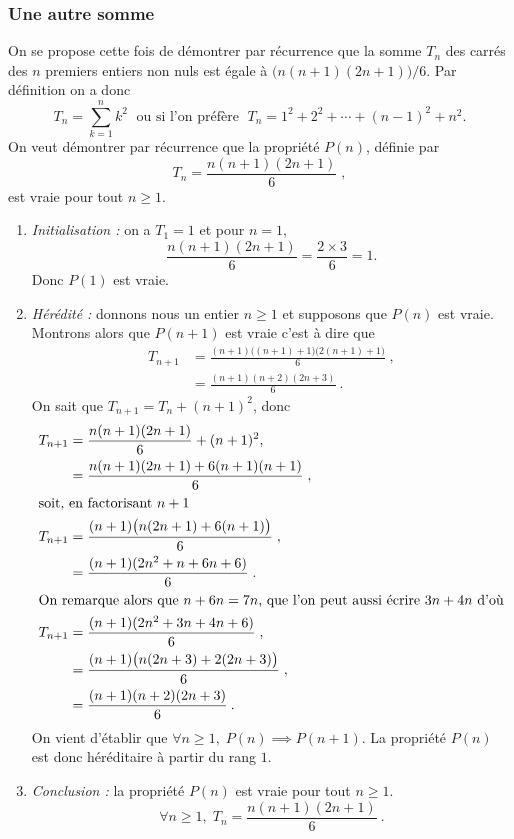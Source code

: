 \subsubsection{Une autre somme}
On se propose cette fois de démontrer par récurrence que la somme $T_n$ des carrés des $n$ premiers entiers non nuls est égale à $\bigl(n(n+1)(2n+1)\bigr)/6$. Par définition on a donc
\[
T_n=\sum_{k=1}^n k^2\;\text{ ou si l'on préfère }\;  T_n=1^2+2^2+\cdots+(n-1)^2+n^2.
\]
On veut démontrer par récurrence que la propriété $P(n)$, définie par
\[
T_n=\frac{n(n+1)(2n+1)}{6}\;,
\]
est vraie pour tout $n≥1$.
\begin{enumerate}
\item \textit{Initialisation :} on a $T_1=1$ et pour $n=1$, 
\[\frac{n(n+1)(2n+1)}{6}=\frac{2\times3}{6}=1.\]
 Donc $P(1)$ est vraie.
\item \textit{Hérédité :} donnons nous un entier $n≥1$ et supposons que $P(n)$ est vraie. 
Montrons alors que $P(n+1)$ est vraie c'est à dire que 
\begin{align*}
T_{n+1}&=\frac{(n+1)\bigl((n+1)+1)(2(n+1)+1\bigr)}{6}\;,\\
&=\frac{(n+1)(n+2)(2n+3)}{6}\:.
\end{align*}
On sait que $T_{n+1}=T_{n}+(n+1)^2$, donc
\begin{align*}
T_{n+1}&=\frac{n(n+1)(2n+1)}{6}+(n+1)^2,\\
&=\frac{n(n+1)(2n+1)+6(n+1)(n+1)}{6}\;,\\
\intertext{soit, en factorisant $n+1$}
T_{n+1}&=\frac{(n+1)\bigl(n(2n+1)+6(n+1)\bigr)}{6}\;,\\
&=\frac{(n+1)(2n^2+n+6n+6)}{6}\;.\\
\intertext{On remarque alors que $n+6n=7n$, que l'on peut aussi écrire $3n+4n$ d'où}
T_{n+1}&=\frac{(n+1)(2n^2+3n+4n+6)}{6}\;,\\
&=\frac{(n+1)\bigl(n(2n+3)+2(2n+3)\bigr)}{6}\;,\\
&=\frac{(n+1)(n+2)(2n+3)}{6}\:.
\end{align*}
On vient d'établir que $\forall n≥1,\;P(n)\implies P(n+1)$. La propriété $P(n)$ est donc héréditaire à partir du rang $1$.
\item \textit{Conclusion :} la propriété $P(n)$ est vraie pour tout $n≥1$.
\[
\forall n≥1,\;T_n=\frac{n(n+1)(2n+1)}{6}\:.
\]
\end{enumerate}

